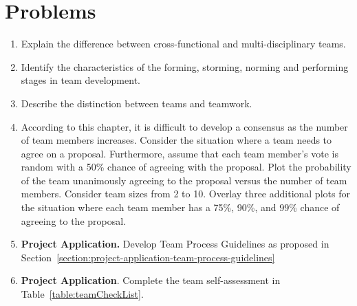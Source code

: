 \section{Problems}
\label{section:teamsProblems}

\begin{enumerate}
\def\labelenumi{\arabic{enumi}.}
\item
  Explain the difference between cross-functional and multi-disciplinary
  teams.
\item
  Identify the characteristics of the forming, storming, norming and
  performing stages in team development.
\item
  Describe the distinction between teams and teamwork.
\item
  According to this chapter, it is difficult to develop a consensus as
  the number of team members increases. Consider the situation where a
  team needs to agree on a proposal. Furthermore, assume that each team
  member's vote is random with a 50\% chance of agreeing with the
  proposal. Plot the probability of the team unanimously agreeing to the
  proposal versus the number of team members. Consider team sizes from 2
  to 10. Overlay three additional plots for the situation where each
  team member has a 75\%, 90\%, and 99\% chance of agreeing to the
  proposal.
\item
  \textbf{Project Application.} Develop Team Process Guidelines as
  proposed in 
Section~\ref{section:project-application-team-process-guidelines}
\item
  \textbf{Project Application}. Complete the team self-assessment in
  Table~\ref{table:teamCheckList}.
\end{enumerate}
